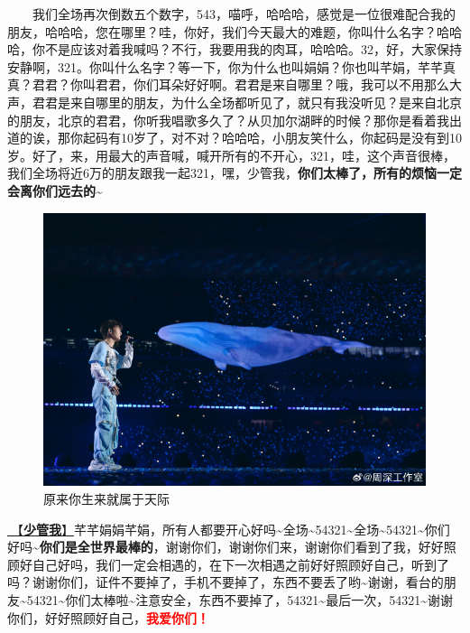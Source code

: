 \documentclass[]{ctexbook}
\begin{document}
  我们全场再次倒数五个数字，543，喵呼，哈哈哈，感觉是一位很难配合我的朋友，哈哈哈，您在哪里？哇，你好，我们今天最大的难题，你叫什么名字？哈哈哈，你不是应该对着我喊吗？不行，我要用我的肉耳，哈哈哈。32，好，大家保持安静啊，321。你叫什么名字？等一下，你为什么也叫娟娟？你也叫芊娟，芊芊真真？君君？你叫君君，你们耳朵好好啊。君君是来自哪里？哦，我可以不用那么大声，君君是来自哪里的朋友，为什么全场都听见了，就只有我没听见？是来自北京的朋友，北京的君君，你听我唱歌多久了？从贝加尔湖畔的时候？那你是看着我出道的诶，那你起码有10岁了，对不对？哈哈哈，小朋友笑什么，你起码是没有到10岁。好了，来，用最大的声音喊，喊开所有的不开心，321，哇，这个声音很棒，我们全场将近6万的朋友跟我一起321，嘿，少管我，\textbf{你们太棒了，所有的烦恼一定会离你们远去的\textasciitilde{}}

\begin{figure}

{\centering \includegraphics[width=400pt]{img/beijing20240921/002} 

}

\caption{原来你生来就属于天际}\label{fig:unnamed-chunk-101}
\end{figure}

\hyperref[watch-ur-manners]{🎵【\textbf{少管我}】}芊芊娟娟芊娟，所有人都要开心好吗\textasciitilde 全场\textasciitilde54321\textasciitilde 全场\textasciitilde54321\textasciitilde 你们好吗\textasciitilde{}\textbf{你们是全世界最棒的}，谢谢你们，谢谢你们来，谢谢你们看到了我，好好照顾好自己好吗，我们一定会相遇的，在下一次相遇之前好好照顾好自己，听到了吗？谢谢你们，证件不要掉了，手机不要掉了，东西不要丢了哟\textasciitilde 谢谢，看台的朋友\textasciitilde54321\textasciitilde 你们太棒啦\textasciitilde 注意安全，东西不要掉了，54321\textasciitilde 最后一次，54321\textasciitilde 谢谢你们，好好照顾好自己，\textbf{\textcolor{red}{我爱你们！}}
\end{document}
